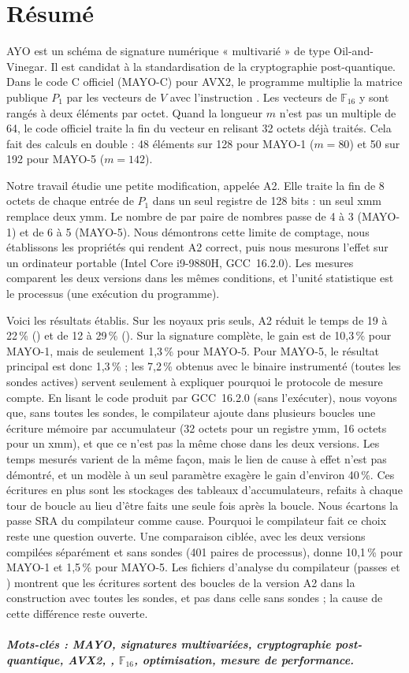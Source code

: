 \chapter*{Résumé}
\label{chap:resume}
AYO est un schéma de signature numérique « multivarié » de type Oil-and-Vinegar. Il est candidat à la standardisation de la cryptographie post-quantique. Dans le code C officiel (MAYO-C) pour AVX2, le programme multiplie la matrice publique $P_1$ par les vecteurs de $V$ avec l'instruction . Les vecteurs de $\mathbb{F}_{16}$ y sont rangés à deux éléments par octet. Quand la longueur $m$ n'est pas un multiple de 64, le code officiel traite la fin du vecteur en relisant 32 octets déjà traités. Cela fait des calculs en double : 48 éléments sur 128 pour MAYO-1 ($m=80$) et 50 sur 192 pour MAYO-5 ($m=142$).

Notre travail étudie une petite modification, appelée A2. Elle traite la fin de 8 octets de chaque entrée de $P_1$ dans un seul registre de 128 bits : un seul  xmm remplace deux  ymm. Le nombre de  par paire de nombres passe de 4 à 3 (MAYO-1) et de 6 à 5 (MAYO-5). Nous démontrons cette limite de comptage, nous établissons les propriétés qui rendent A2 correct, puis nous mesurons l'effet sur un ordinateur portable (Intel Core i9-9880H, GCC~16.2.0). Les mesures comparent les deux versions dans les mêmes conditions, et l'unité statistique est le processus (une exécution du programme).

Voici les résultats établis. Sur les noyaux pris seuls, A2 réduit le temps de 19 à 22\,\% () et de 12 à 29\,\% (). Sur la signature complète, le gain est de 10,3\,\% pour MAYO-1, mais de seulement 1,3\,\% pour MAYO-5. Pour MAYO-5, le résultat principal est donc 1,3\,\% ; les 7,2\,\% obtenus avec le binaire instrumenté (toutes les sondes actives) servent seulement à expliquer pourquoi le protocole de mesure compte. En lisant le code produit par GCC~16.2.0 (sans l'exécuter), nous voyons que, sans toutes les sondes, le compilateur ajoute dans plusieurs boucles une écriture mémoire par accumulateur (32 octets pour un registre ymm, 16 octets pour un xmm), et que ce n'est pas la même chose dans les deux versions. Les temps mesurés varient de la même façon, mais le lien de cause à effet n'est pas démontré, et un modèle à un seul paramètre exagère le gain d'environ 40\,\%. Ces écritures en plus sont les stockages des tableaux d'accumulateurs, refaits à chaque tour de boucle au lieu d'être faits une seule fois après la boucle. Nous écartons la passe SRA du compilateur comme cause. Pourquoi le compilateur fait ce choix reste une question ouverte. Une comparaison ciblée, avec les deux versions compilées séparément et sans sondes (401 paires de processus), donne 10,1\,\% pour MAYO-1 et 1,5\,\% pour MAYO-5. Les fichiers d'analyse du compilateur (passes  et ) montrent que les écritures sortent des boucles de la version A2 dans la construction avec toutes les sondes, et pas dans celle sans sondes ; la cause de cette différence reste ouverte.

\paragraph{Mots-clés : MAYO, signatures multivariées, cryptographie post-quantique, AVX2, , $\mathbb{F}_{16}$, optimisation, mesure de performance.}
\clearpage
